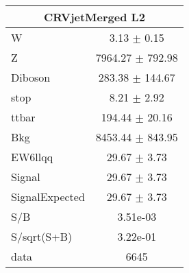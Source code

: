 \begin{table}
{\begin{tabular}{|l|c|}
\hline
\multicolumn{2}{|c|}{CRVjetMerged L2}\\ \hline
W & 3.13 $\pm$ 0.15\\
Z & 7964.27 $\pm$ 792.98\\
Diboson & 283.38 $\pm$ 144.67\\
stop & 8.21 $\pm$ 2.92\\
ttbar & 194.44 $\pm$ 20.16\\
\hline
Bkg & 8453.44 $\pm$ 843.95\\
\hline
EW6llqq & 29.67 $\pm$ 3.73\\
\hline
Signal & 29.67 $\pm$ 3.73\\
SignalExpected & 29.67 $\pm$ 3.73\\
\hline
S/B & 3.51e-03\\
S/sqrt(S+B) & 3.22e-01\\
\hline
data & 6645\\ \hline
\end{tabular}
}
\end{table}

